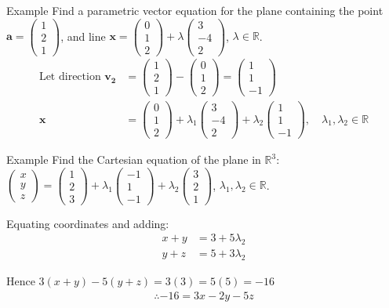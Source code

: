 \documentclass{report}
\newcommand{\cvec}[1]{ \begin{pmatrix} #1 \end{pmatrix} }
\begin{document}
		\begin{question}{Example}
			Find a parametric vector equation for the plane containing the point $\mathbf{a} = \cvec{1\\2\\1}$, and line $\mathbf{x} = \cvec{0\\1\\2} + \lambda \cvec{3\\-4\\2}$, $\lambda \in \mathbb{R}$.
			\begin{align*}
				\text{Let direction } \mathbf{v_2} &= \cvec{1\\2\\1} - \cvec{0\\1\\2} = \cvec{1\\1\\-1}	\\
				\mathbf{x} &= \cvec{0\\1\\2} + \lambda_1 \cvec{3\\-4\\2} + \lambda_2 \cvec{1\\1\\-1}, \quad \lambda_1, \lambda_2 \in \mathbb{R}
			\end{align*}
		\end{question}

		\begin{question}{Example}
			Find the Cartesian equation of the plane in $\mathbb{R}^3$: $\cvec{x\\y\\z} = \cvec{1\\2\\3} + \lambda_1 \cvec{-1\\1\\-1} + \lambda_2 \cvec{3\\2\\1}$, $\lambda_1, \lambda_2 \in \mathbb{R}$.

			Equating coordinates and adding:
			\begin{align*}
				x + y &= 3 + 5 \lambda_2	\\
				y + z &= 5 + 3 \lambda_2
			\end{align*}

			Hence $3(x+y) - 5(y+z) = 3(3) = 5(5) = -16$
			\begin{align*}
				\therefore -16 = 3x - 2y - 5z
			\end{align*}
		\end{question}
\end{document}

